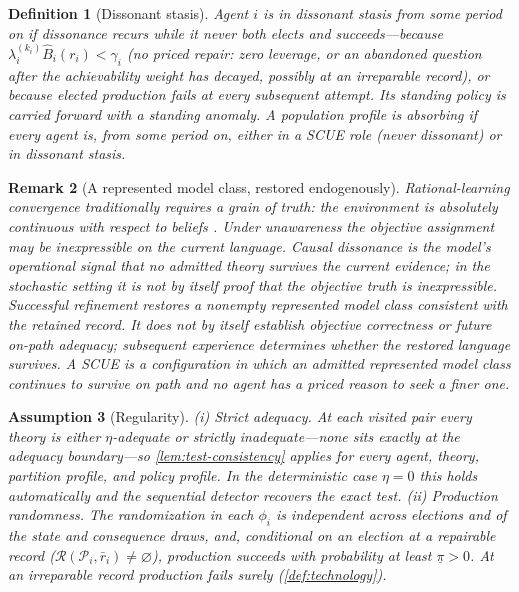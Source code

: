 \documentclass[11pt]{article}
\newtheorem{assumption}{Assumption}[section]
\newtheorem{definition}[assumption]{Definition}
\newtheorem{remark}[assumption]{Remark}
\theoremstyle{definition}
\newcommand{\emptysetset}{\varnothing}
\begin{document}
\begin{definition}[Dissonant stasis]
\label{def:stasis}
Agent $i$ is in \emph{dissonant stasis} from some period on if dissonance recurs while it never both elects and succeeds---because $\lambda_i^{(k_i)}\widehat B_i(r_i)<\gamma_i$ (no priced repair: zero leverage, or an abandoned question after the achievability weight has decayed, possibly at an irreparable record), or because elected production fails at every subsequent attempt.
Its standing policy is carried forward with a standing anomaly.
A population profile is \emph{absorbing} if every agent is, from some period on, either in a SCUE role (never dissonant) or in dissonant stasis.
\end{definition}

\begin{remark}[A represented model class, restored endogenously]
\label{rem:grain}
Rational-learning convergence traditionally requires a grain of truth: the environment is absolutely continuous with respect to beliefs \citep{KalaiLehrer1993a}.
Under unawareness the objective assignment may be inexpressible on the current language.
Causal dissonance is the model's operational signal that no admitted theory survives the current evidence; in the stochastic setting it is not by itself proof that the objective truth is inexpressible.
Successful refinement restores a nonempty represented model class consistent with the retained record.
It does not by itself establish objective correctness or future on-path adequacy; subsequent experience determines whether the restored language survives.
A SCUE is a configuration in which an admitted represented model class continues to survive on path and no agent has a priced reason to seek a finer one.
\end{remark}

\begin{assumption}[Regularity]
\label{ass:regularity}
(i) \emph{Strict adequacy.}
At each visited pair every theory is either $\eta$-adequate or strictly inadequate---none sits exactly at the adequacy boundary---so \cref{lem:test-consistency} applies for every agent, theory, partition profile, and policy profile.
In the deterministic case $\eta=0$ this holds automatically and the sequential detector recovers the exact test.
(ii) \emph{Production randomness.}
The randomization in each $\phi_i$ is independent across elections and of the state and consequence draws, and, conditional on an election at a \emph{repairable} record ($\mathcal R(\mathcal P_i,\bar r_i)\neq\emptysetset$), production succeeds with probability at least $\underline\pi>0$.
At an irreparable record production fails surely (\cref{def:technology}).
\end{assumption}
\end{document}
